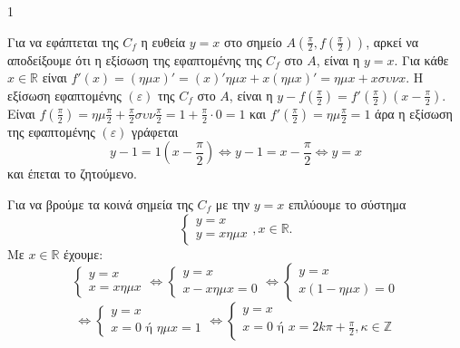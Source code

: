 \begin{ylh}{1}
    \item [Διαφορικός Λογισμός - Εφαπτομένη Συνάρτησης, Σύστημα Εξισώσεων, Ασύμπτωτες, Ανισότητες]
\end{ylh}

\begin{alist}
\item %
    \begin{rlist}
    \item %
    Για να εφάπτεται της $C_f$ η ευθεία $y=x$ στο σημείο $A\left(\frac{\pi}{2}, f\left(\frac{\pi}{2}\right)\right)$, αρκεί να αποδείξουμε ότι η εξίσωση της εφαπτομένης της $C_f$ στο $A$, είναι η $y=x$.
    Για κάθε $x \in \mathbb{R}$ είναι $f'(x) = (\eta\mu x)' = (x)' \eta\mu x + x (\eta\mu x)' = \eta\mu x + x\sigma\upsilon\nu x$.
    Η εξίσωση εφαπτομένης $(\varepsilon)$ της $C_f$ στο $A$, είναι η $y - f\left(\frac{\pi}{2}\right) = f'\left(\frac{\pi}{2}\right) \left(x - \frac{\pi}{2}\right)$.
    Είναι $f\left(\frac{\pi}{2}\right) = \eta\mu \frac{\pi}{2} + \frac{\pi}{2} \sigma\upsilon\nu \frac{\pi}{2} = 1 + \frac{\pi}{2} \cdot 0 = 1$ και $f'\left(\frac{\pi}{2}\right) = \eta\mu \frac{\pi}{2} = 1$ άρα η εξίσωση της εφαπτομένης $(\varepsilon)$ γράφεται
    \[ y - 1 = 1 \left(x - \frac{\pi}{2}\right) \Leftrightarrow y - 1 = x - \frac{\pi}{2} \Leftrightarrow y = x \]
    και έπεται το ζητούμενο.
    \item %
    Για να βρούμε τα κοινά σημεία της $C_f$ με την $y=x$ επιλύουμε το σύστημα
    \[ \left\{ \begin{array}{l} y=x \\ y=x\eta\mu x \end{array} \right., x \in \mathbb{R}. \]
    Με $x \in \mathbb{R}$ έχουμε:
    \[ \left\{ \begin{array}{l} y=x \\ x=x\eta\mu x \end{array} \right. \Leftrightarrow \left\{ \begin{array}{l} y=x \\ x-x\eta\mu x=0 \end{array} \right. \Leftrightarrow \left\{ \begin{array}{l} y=x \\ x(1-\eta\mu x)=0 \end{array} \right. \]
    \[ \Leftrightarrow \left\{ \begin{array}{l} y=x \\ x=0 \text{ ή } \eta\mu x=1 \end{array} \right. \Leftrightarrow \left\{ \begin{array}{l} y=x \\ x=0 \text{ ή } x=2k\pi+\frac{\pi}{2}, \kappa \in \mathbb{Z} \end{array} \right. \]

\end{rlist}
\end{alist}
